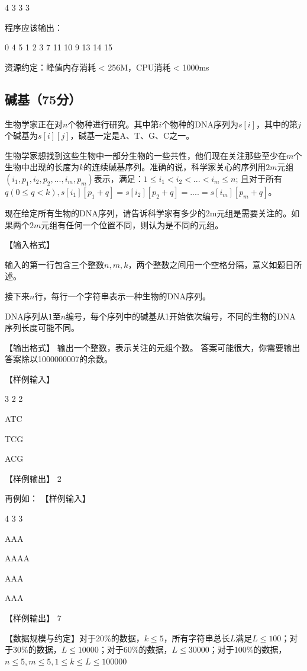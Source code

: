 \documentclass[a4paper, 12pt, twocolumn]{ctexart}
\begin{document}
	4 3 3 3
	
	程序应该输出：
	
	0 4 5 1 2 3 7 11 10 9 13 14 15
	
	
	资源约定：峰值内存消耗 < 256M，CPU消耗  < 1000ms
	
	\subsection{碱基（75分）}
	
	生物学家正在对$n$个物种进行研究。其中第$i$个物种的DNA序列为$s[i]$，其中的第$j$个碱基为$s[i][j]$，碱基一定是A、T、G、C之一。
	
	生物学家想找到这些生物中一部分生物的一些共性，他们现在关注那些至少在$m$个生物中出现的长度为$k$的连续碱基序列。准确的说，科学家关心的序列用$2m$元组$(i_1,p_1,i_2,p_2,...,i_m,p_m)$表示，满足：$1\leq i_1<i_2<...<i_m\leq n$;
	且对于所有$q(0\leq q<k), s[i_1][p_1+q]=s[i_2][p_2+q]=....=s[i_m][p_m+q]$。
	
	现在给定所有生物的DNA序列，请告诉科学家有多少的2m元组是需要关注的。如果两个$2m$元组有任何一个位置不同，则认为是不同的元组。
	
	【输入格式】
	
	输入的第一行包含三个整数$n,m,k$，两个整数之间用一个空格分隔，意义如题目所述。
	
	接下来$n$行，每行一个字符串表示一种生物的DNA序列。
	
	DNA序列从$1$至$n$编号，每个序列中的碱基从1开始依次编号，不同的生物的DNA序列长度可能不同。
	
	【输出格式】
	输出一个整数，表示关注的元组个数。
	答案可能很大，你需要输出答案除以1000000007的余数。
	
	【样例输入】
	
	3 2 2
	
	ATC
	
	TCG
	
	ACG
	
	【样例输出】
	2
	
	再例如：
	【样例输入】
	
	4 3 3
	
	AAA
	
	AAAA
	
	AAA
	
	AAA
	
	【样例输出】
	7
	
	
	【数据规模与约定】对于20\%的数据，$k\leq5$，所有字符串总长$L$满足$L\leq100$；对于30\%的数据，$L\leq10000$；对于60\%的数据，$L\leq30000$；对于100\%的数据，$n\leq5,m\leq5,1\leq k\leq L\leq100000$
	
\end{document}
